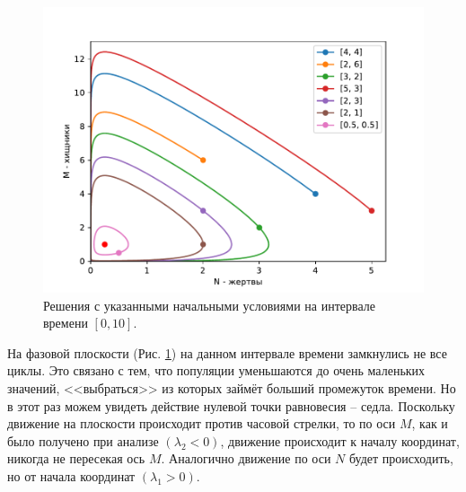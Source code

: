         \begin{figure}[H]
            \centering
            \includegraphics[width=15cm]{pictures/population5.pdf}
            \caption{Решения с указанными начальными условиями на интервале времени $ [0, 10] $.}\label{exp2p}
        \end{figure}
        На фазовой плоскости (Рис. \ref{exp2p}) на данном интервале времени замкнулись не все циклы. Это связано с тем, что популяции уменьшаются до очень маленьких значений, <<выбраться>> из которых займёт больший промежуток времени. Но в этот раз можем увидеть действие нулевой точки равновесия -- седла. Поскольку движение на плоскости происходит против часовой стрелки, то по оси $ M $, как и было получено при анализе $(\lambda_2 < 0)$, движение происходит к началу координат, никогда не пересекая ось $ M $. Аналогично движение по оси $N$ будет происходить, но от начала координат $(\lambda_1 > 0)$. 


